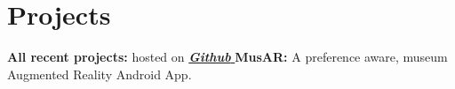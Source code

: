 \section{Projects}
\textbf{All recent projects:} hosted on \href{http://resume.github.com/?tUrG0n}{\textit{\textbf{Github} } }
\blankline
\textbf{MusAR:} A preference aware, museum Augmented Reality Android App.
\blankline
